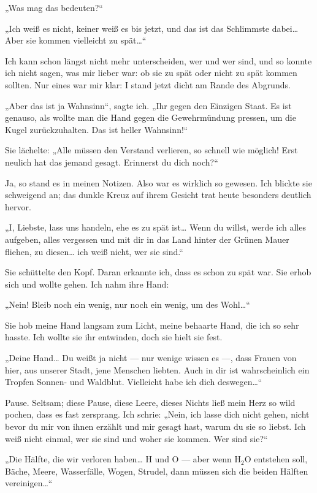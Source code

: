 „Was mag das bedeuten?“

„Ich weiß es nicht, keiner weiß es bis jetzt, und das ist das
Schlimmste dabei\ldots{} Aber sie kommen vielleicht zu spät\ldots{}“

Ich kann schon längst nicht mehr unterscheiden, wer  und wer 
sind, und so konnte ich nicht sagen, was mir lieber war: ob sie zu
spät oder nicht zu spät kommen sollten. Nur eines war mir klar: I
stand jetzt dicht am Rande des Abgrunds.

„Aber das ist ja Wahnsinn“, sagte ich. „Ihr gegen den Einzigen
Staat. Es ist genauso, als wollte man die Hand
gegen die Gewehrmündung pressen, um die Kugel zurückzuhalten. Das
ist heller Wahnsinn!“

Sie lächelte: „Alle müssen den Verstand verlieren, so schnell wie
möglich! Erst neulich hat das jemand gesagt. Erinnerst du dich
noch?“

Ja, so stand es in meinen Notizen. Also war es wirklich so gewesen.
Ich blickte sie schweigend an; das dunkle Kreuz auf ihrem Gesicht
trat heute besonders deutlich hervor.

„I, Liebste, lass uns handeln, ehe es zu spät ist\ldots{} Wenn du
willst, werde ich alles aufgeben, alles vergessen und mit dir in
das Land hinter der Grünen Mauer fliehen, zu diesen\ldots{} ich weiß
nicht, wer sie sind.“

Sie schüttelte den Kopf. Daran erkannte ich,
dass es schon zu spät war. Sie erhob sich und wollte gehen. Ich
nahm ihre Hand:

„Nein! Bleib noch ein wenig, nur noch ein wenig, um des Wohl\ldots{}“

Sie hob meine Hand langsam zum Licht, meine behaarte Hand, die ich
so sehr hasste. Ich wollte sie ihr entwinden, doch sie hielt sie
fest.

„Deine Hand\ldots{} Du weißt ja nicht — nur wenige wissen es —, dass
Frauen von hier, aus unserer Stadt, jene Menschen liebten. Auch in
dir ist wahrscheinlich ein Tropfen Sonnen- und Waldblut. Vielleicht
habe ich dich deswegen\ldots{}“

Pause. Seltsam; diese Pause, diese Leere, dieses Nichts ließ mein
Herz so wild pochen, dass es fast zersprang. Ich schrie: „Nein, ich
lasse dich nicht gehen, nicht bevor du mir von ihnen erzählt und
mir gesagt hast, warum du sie so liebst. Ich weiß nicht einmal, wer
sie sind und woher sie kommen. Wer sind sie?“

„Die Hälfte, die wir
verloren haben\ldots{} H und O — aber wenn $\mathrm{H_2O}$ entstehen soll, Bäche,
Meere, Wasserfälle, Wogen, Strudel, dann müssen sich die beiden
Hälften vereinigen\ldots{}“

